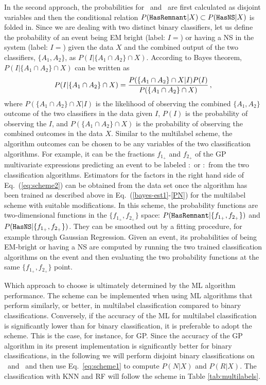 In the second approach, the probabilities for \hasns\ and \hasrem\ are first calculated as disjoint variables and then the conditional relation $P({{\tt HasRemnant}}|X)\subset P({{\tt HasNS}}|X)$ is
folded in. Since we are dealing with two distinct binary classifiers, let us define the probability of an event being \ac{EM} bright (label: $I=$\hasrem) or having a \ac{NS} in the system (label: $I=$\hasns) given the data $X$ and the combined output of the two classifiers, $\{A_1,A_2\}$, as $P(I|\{A_1\cap A_2\}\cap X)$. According to Bayes theorem, $P(I|\{A_1\cap A_2\}\cap X)$ can be written as
%
\begin{equation}
P(I|\{A_1\cap A_2\} \cap X)=\frac{P(\{A_1\cap A_2\}\cap X|I)P(I)}{P(\{A_1\cap A_2\}\cap X)}\,,\\
\label{eq:scheme2}
\end{equation}
%
where $P(\{A_1\cap A_2\}\cap X|I)$ is the likelihood of observing the combined $\{A_1,A_2\}$ outcome of the two classifiers in the data given $I$, $P(I)$ is the probability of observing the $I$, and $P(\{A_1\cap A_2\}\cap X)$ is the probability of observing the combined outcomes in the data $X$. Similar to the multilabel scheme, the algorithm outcomes can be chosen to be any variables of the two classification algorithms. For example, it can be the fractions $f_{1_+}$ and $f_{2_+}$ of the \ac{GP} multivariate expressions predicting an event to be labeled \hasns:\true\ or \hasrem:\true\ from the two classification algorithms. Estimators for the factors in the right hand side of Eq.~(\ref{eq:scheme2}) can be obtained from the data set once the algorithm has been trained as described above in Eq.~(\ref{bayes-est1}-\ref{PN}) for the multilabel scheme with suitable modifications. In this scheme, the probability functions are two-dimensional functions in the $\{f_{1_+},f_{2_+}\}$ space: $P({{\tt HasRemnant}}|\{f_{1_+},f_{2_+}\})$ and $P({{\tt HasNS}}|\{f_{1_+},f_{2_+}\})$. They can be smoothed out by a fitting procedure, for example through Gaussian Regression. Given an event, its probabilities of being \ac{EM}-bright or having a \ac{NS} are computed by running the two trained classification algorithms on the event and then evaluating the two probability functions at the same $\{f_{1_+},f_{2_+}\}$ point.

Which approach to choose is ultimately determined by the \ac{ML} algorithm performance. The  scheme can be implemented when using \ac{ML} algorithms that perform similarly, or
better, in multilabel classification compared to binary classifications. Conversely, if the accuracy of the \ac{ML} for multilabel classification is significantly lower than for binary
classification, it is preferable to adopt the  scheme. This is the case, for instance, for \ac{GP}. Since the accuracy of the \ac{GP} algorithm in its present implementation is
significantly better for binary classifications, in the following we will perform disjoint binary classifications on \hasns\ and \hasrem\ and then use Eq.~\ref{eq:scheme1} to compute
$P(N|X)$ and $P(R|X)$. The classification with \ac{KNN} and \ac{RF} will follow the scheme in Table \ref{tab:multilabels}. 
